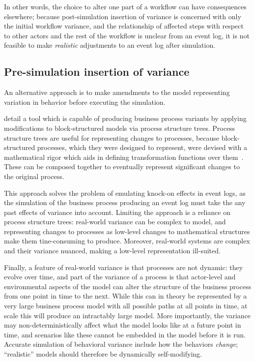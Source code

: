 \documentclass[draft,12pt]{llncs}  %
\begin{document}
In other words, the choice to alter one part of a workflow can have consequences
elsewhere; because post-simulation insertion of variance is concerned with only
the initial workflow variance, and the relationship of affected steps with
respect to other actors and the rest of the workflow is unclear from an event
log, it is not feasible to make \emph{realistic} adjustments to an event log
after simulation.
\par


\subsection{Pre-simulation insertion of variance}
An alternative approach is to make amendments to the model
representing variation in behavior before executing the simulation.
\par

\cite{pourmasoumi2015business} detail a tool which is capable of producing
business process variants by applying modifications to block-structured models
via process structure trees. Process structure trees are useful for representing
changes to processes, because block-structured processes, which they were
designed to represent, were devised with a mathematical rigor which aids in
defining transformation functions over them~\citep{li2010mining}. These can be composed together to
eventually represent significant changes to the original process.\par

This approach solves the problem of emulating knock-on effects in event logs, as
the simulation of the business process producing an event log must take the any
past effects of variance into account. Limiting the approach is a reliance on
process structure trees: real-world variance can be complex to model, and
representing changes to processes as low-level changes to mathematical
structures make them tine-consuming to produce. Moreover, real-world systems are
complex and their variance nuanced, making a low-level representation
ill-suited.
\par

Finally, a feature of real-world variance is that processes are not dynamic:
they evolve over time, and part of the variance of a process is that actor-level
and environmental aspects of the model can alter the structure of the business
process from one point in time to the next. While this can in theory be
represented by a very large business process model with all possible paths at
all points in time, at scale this will produce an intractably large model. More
importantly, the variance may non-deterministically affect what the model looks
like at a future point in time, and scenarios like these cannot be embedded in
the model before it is run. Accurate simulation of behavioral variance include
how the behaviors \emph{change}; ``realistic'' models should therefore be
dynamically self-modifying.
\par
\end{document}
